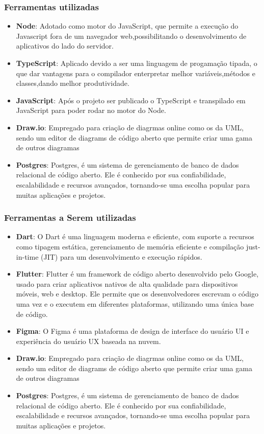 \documentclass[a4paper,12pt]{article}
\begin{document}
\subsubsection{Ferramentas utilizadas}
\begin{itemize}
    \item \textbf{Node}: Adotado como motor do JavaScript, que permite a execução do Javascript fora de um navegador web,possibilitando o desenvolvimento de aplicativos do lado do servidor.
    \item \textbf{TypeScript}: Aplicado devido a ser uma linguagem de progamação tipada, o que dar vantagens para o compilador enterpretar melhor variáveis,métodos e classes,dando melhor produtividade.
    \item \textbf{JavaScript}: Após o projeto ser publicado o TypeScript e transpilado em JavaScript para poder rodar no motor do Node.
    \item \textbf{Draw.io}: Empregado para criação de diagrmas online como os da \ac{UML}, sendo um editor de diagrams de código aberto que permite criar uma gama de outros diagramas
    \item \textbf{Postgres}: Postgres, é um sistema de gerenciamento de banco de dados relacional de código aberto. Ele é conhecido por sua confiabilidade, escalabilidade e recursos avançados, tornando-se uma escolha popular para muitas aplicações e projetos.
\end{itemize}
\subsubsection{Ferramentas a Serem utilizadas}
\begin{itemize}
    \item \textbf{Dart}: O Dart é uma linguagem moderna e eficiente, com suporte a recursos como tipagem estática, gerenciamento de memória eficiente e compilação just-in-time (JIT) para um desenvolvimento e execução rápidos.
    \item \textbf{Flutter}: Flutter é um framework de código aberto desenvolvido pelo Google, usado para criar aplicativos nativos de alta qualidade para dispositivos móveis, web e desktop. Ele permite que os desenvolvedores escrevam o código uma vez e o executem em diferentes plataformas, utilizando uma única base de código.
    \item \textbf{Figma}: O Figma é uma plataforma de design de interface do usuário \ac{UI} e experiência do usuário \ac{UX} baseada na nuvem.
    \item \textbf{Draw.io}: Empregado para criação de diagrmas online como os da \ac{UML}, sendo um editor de diagrams de código aberto que permite criar uma gama de outros diagramas
    \item \textbf{Postgres}: Postgres, é um sistema de gerenciamento de banco de dados relacional de código aberto. Ele é conhecido por sua confiabilidade, escalabilidade e recursos avançados, tornando-se uma escolha popular para muitas aplicações e projetos.
\end{itemize}
\end{document}
